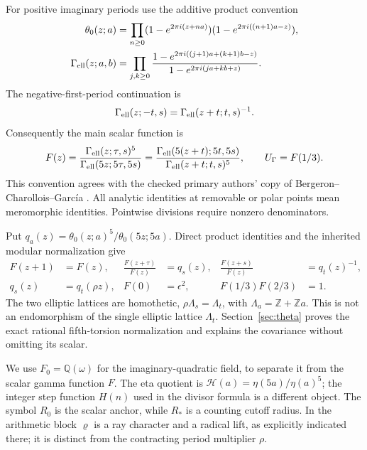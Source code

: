 \documentclass[11pt]{article}
\theoremstyle{definition}\newtheorem{definition}[theorem]{Definition}
\theoremstyle{remark}\newtheorem{remark}[theorem]{Remark}
\begin{document}
For positive imaginary periods use the additive product convention
\begin{align}
 \theta_0(z;a)&=\prod_{n\ge0}(1-e^{2\pi i(z+na)})(1-e^{2\pi i((n+1)a-z)}),\label{eq:theta-product}\\
 \Gamma_{\rm ell}(z;a,b)&=\prod_{j,k\ge0}
 \frac{1-e^{2\pi i((j+1)a+(k+1)b-z)}}{1-e^{2\pi i(ja+kb+z)}}.\label{eq:gamma-product}
\end{align}
The negative-first-period continuation is
\[
 \Gamma_{\rm ell}(z;-t,s)=\Gamma_{\rm ell}(z+t;t,s)^{-1}.
\]
Consequently the main scalar function is
\[
 F(z)=\frac{\Gamma_{\rm ell}(z;\tau,s)^5}{\Gamma_{\rm ell}(5z;5\tau,5s)}
 =\frac{\Gamma_{\rm ell}(5(z+t);5t,5s)}{\Gamma_{\rm ell}(z+t;t,s)^5},
 \qquad U_\Gamma=F(1/3).
\]
This convention agrees with the checked primary authors' copy of Bergeron--Charollois--Garc\'ia \cite{BCG}. All analytic identities at removable or polar points mean meromorphic identities. Pointwise divisions require nonzero denominators.

Put $q_a(z)=\theta_0(z;a)^5/\theta_0(5z;5a)$. Direct product identities and the inherited modular normalization give
\begin{equation}\label{eq:F-identities}
\begin{aligned}
 F(z+1)&=F(z),&\frac{F(z+\tau)}{F(z)}&=q_s(z),&
 \frac{F(z+s)}{F(z)}&=q_t(z)^{-1},\\
 q_s(z)&=q_t(\rho z),&F(0)&=\epsilon^2,&F(1/3)F(2/3)&=1.
\end{aligned}
\end{equation}
The two elliptic lattices are homothetic, $\rho\Lambda_s=\Lambda_t$, with $\Lambda_a=\mathbb Z+\mathbb Za$. This is not an endomorphism of the single elliptic lattice $\Lambda_t$. Section~\ref{sec:theta} proves the exact rational fifth-torsion normalization and explains the covariance without omitting its scalar.

We use $F_0=\mathbb Q(\omega)$ for the imaginary-quadratic field, to separate it from the scalar gamma function $F$. The eta quotient is $\mathcal H(a)=\eta(5a)/\eta(a)^5$; the integer step function $H(n)$ used in the divisor formula is a different object. The symbol $R_0$ is the scalar anchor, while $R_*$ is a counting cutoff radius. In the arithmetic block $\varrho$ is a ray character and a radical lift, as explicitly indicated there; it is distinct from the contracting period multiplier $\rho$.
\end{document}
